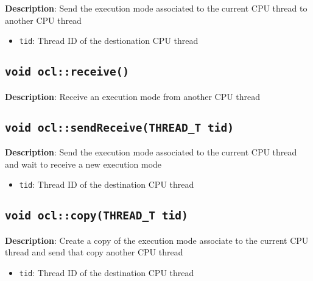 \textbf{Description}: Send the execution mode associated to the current CPU thread to another CPU thread
\begin{itemize}
  \item \texttt{tid}: Thread ID of the destionation CPU thread
\end{itemize}

\subsection{\texttt{void ocl::receive()}}

\textbf{Description}: Receive an execution mode from another CPU thread

\subsection{\texttt{void ocl::sendReceive(THREAD\_T tid)}}

\textbf{Description}: Send the execution mode associated to the current CPU thread and wait to receive a new execution mode
\begin{itemize}
  \item \texttt{tid}: Thread ID of the destination CPU thread
\end{itemize}

\subsection{\texttt{void ocl::copy(THREAD\_T tid)}}

\textbf{Description}: Create a copy of the execution mode associate to the current CPU thread and send that copy another CPU thread
\begin{itemize}
  \item \texttt{tid}: Thread ID of the destination CPU thread
\end{itemize}

